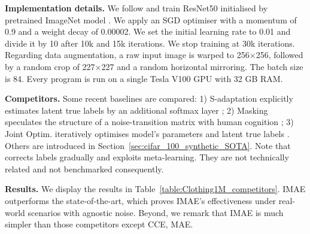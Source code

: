 \documentclass{article}
\begin{document}
\noindent
\textbf{Implementation details.}
We follow \cite{patrini2017making,tanaka2018joint,wang2019symmetric} and train ResNet50 initialised by pretrained ImageNet model \cite{russakovsky2015imagenet}. We apply an SGD optimiser with a momentum of 0.9 and a weight decay of 0.00002. We set the initial learning rate to 0.01 and divide it by 10 after 10k and 15k iterations. We stop training at 30k iterations. Regarding data augmentation, a raw input image is warped to 256$\times$256, followed by a random crop of 227$\times$227 and a random horizontal mirroring. The batch size is 84. 
Every program is run on a single Tesla V100 GPU with 32 GB RAM.

\noindent
\textbf{Competitors.} Some recent baselines are compared: 1) S-adaptation explicitly estimates latent true labels by an additional softmax layer \cite{goldberger2017training};
2) Masking speculates the structure of a noise-transition matrix with human cognition \cite{han2018masking}; 
3) Joint Optim. iteratively optimises model's parameters and latent true labels \cite{tanaka2018joint}.
Others are introduced in Section~\ref{sec:cifar_100_synthetic_SOTA}.
Note that \cite{han2019deep} corrects labels gradually and \cite{li2019learning} exploits meta-learning. They are not technically related and not benchmarked consequently. 

\noindent
\textbf{Results.} 
We display the results in Table~\ref{table:Clothing1M_competitors}.
IMAE outperforms the state-of-the-art, which proves IMAE's effectiveness under real-world scenarios with agnostic noise. 
Beyond, we remark that IMAE is much simpler than those competitors except CCE, MAE.  
\end{document}
